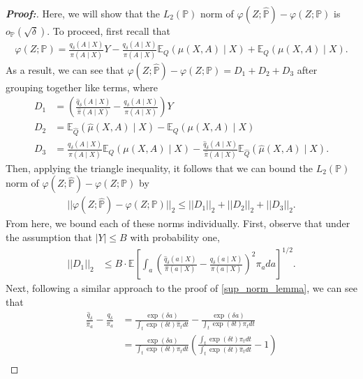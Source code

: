 \documentclass[11pt,twoside]{article}
\theoremstyle{definition}
\theoremstyle{remark}
\let\hat\widehat
\begin{document}
\begin{proof}[\textbf{Proof:}]
   Here, we will show that the $L_2(\mathbb{P})$ norm of $\varphi(Z; \hat{\mathbb{P}}) - \varphi(Z; \mathbb{P})$ is $o_\mathbb{P}(\sqrt{\delta})$. To proceed, first recall that
   \begin{align*}
       \varphi(Z; \mathbb{P}) = \frac{q_\delta(A \mid X)}{\pi(A \mid X)} Y - \frac{q_\delta(A \mid X)}{\pi(A \mid X)}\mathbb{E}_Q(\mu(X, A) \mid X)  + \mathbb{E}_Q(\mu(X, A) \mid X).
   \end{align*}
As a result, we can see that $\varphi(Z; \hat{\mathbb{P}}) - \varphi(Z; \mathbb{P}) = D_1 + D_2 + D_3$  after grouping together like terms, where
\begin{align*}
    D_1 &= \left(\frac{\hat{q}_\delta(A \mid X)}{\hat{\pi}(A \mid X)} - \frac{q_\delta(A \mid X)}{\pi(A \mid X)} \right) Y \\
    D_2 &= \mathbb{E}_{\hat{Q}}(\hat{\mu}(X, A) \mid X) - \mathbb{E}_Q(\mu(X, A) \mid X) \\
    D_3 &= \frac{q_\delta(A \mid X)}{\pi(A \mid X)}\mathbb{E}_Q(\mu(X, A) \mid X) - \frac{\hat{q}_\delta(A \mid X)}{\hat{\pi}(A \mid X)}\mathbb{E}_{\hat{Q}}(\hat{\mu}(X, A) \mid X).
\end{align*}
Then, applying the triangle inequality, it follows that we can bound the $L_2(\mathbb{P})$ norm of $\varphi(Z; \hat{\mathbb{P}}) - \varphi(Z; \mathbb{P})$ by
\begin{align*}
    ||\varphi(Z; \hat{\mathbb{P}}) - \varphi(Z; \mathbb{P})||_2 \leq ||D_1||_2 + ||D_2||_2 + ||D_3||_2.
\end{align*}
From here, we bound each of these norms individually. First, observe that under the assumption that $|Y| \leq B$ with probability one,
\begin{align*}
    ||D_1||_2 &\leq B \cdot \mathbb{E} \left[\int_a \left(\frac{\hat{q}_\delta(a \mid X)}{\hat{\pi}(a \mid X)} - \frac{q_\delta(a \mid X)}{\pi(a \mid X)} \right)^2 \pi_a da\right]^{1/2}.
\end{align*}
Next, following a similar approach to the proof of \cref{sup_norm_lemma}, we can see that
\begin{align*}
    \frac{\hat{q}_\delta}{\hat{\pi}_a} - \frac{q_\delta}{\pi_a} &= \frac{\exp(\delta a)}{\int_t \exp(\delta t) \hat{\pi}_t dt} - \frac{\exp(\delta a)}{\int_t \exp(\delta t) \pi_t dt} \\
    &= \frac{\exp(\delta a)}{\int_t \exp(\delta t) \pi_t dt}\left(\frac{\int_t \exp(\delta t) \pi_t dt}{\int_t \exp(\delta t) \hat{\pi}_t dt} - 1 \right) \\

\end{align*}
\end{proof}
\end{document}
